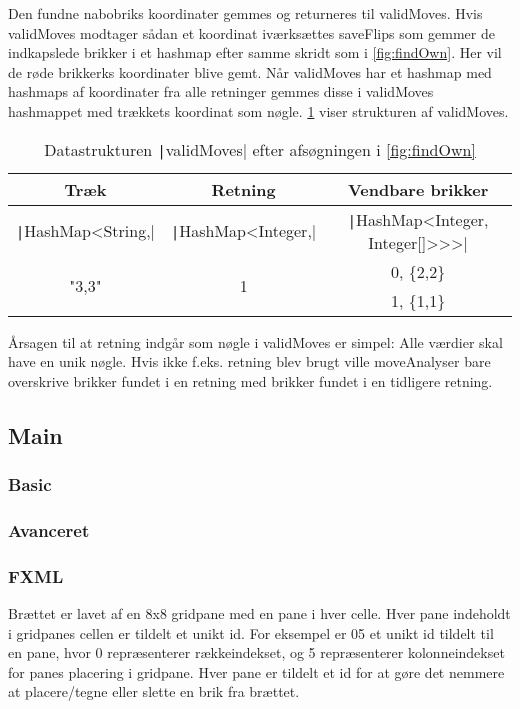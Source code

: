 Den fundne nabobriks koordinater gemmes og returneres til validMoves. Hvis validMoves modtager sådan et koordinat iværksættes saveFlips som gemmer de indkapslede brikker i et hashmap efter samme skridt som i \cref{fig:findOwn}. Her vil de røde brikkerks koordinater blive gemt.\newline
Når validMoves har et hashmap med hashmaps af koordinater fra alle retninger gemmes disse i validMoves hashmappet med trækkets koordinat som nøgle. \cref{tbl:hashmaps} viser strukturen af validMoves.
\begin{table}[H]
    \centering
    \caption{Datastrukturen \texttt|validMoves| efter afsøgningen i \cref{fig:findOwn}}\label{tbl:hashmaps}
    \begin{tabular}{ccc}
        \toprule
        Træk                               & Retning                             & Vendbare brikker                                 \\
        \midrule
        \texttt|HashMap<String,| & \texttt|HashMap<Integer,| & \texttt|HashMap<Integer, Integer[]>>>| \\
        \multirow{2}{*}{"3,3"}             & \multirow{2}{*}{1}                  & 0, \{2,2\}                                         \\
                                           &                                     & 1, \{1,1\}                                         \\
        \bottomrule
    \end{tabular}
\end{table}
Årsagen til at retning indgår som nøgle i validMoves er simpel: Alle værdier skal have en unik nøgle. Hvis ikke f.eks. retning blev brugt ville moveAnalyser bare overskrive brikker fundet i en retning med brikker fundet i en tidligere retning.
\subsection{Main}

\subsubsection{Basic}

\subsubsection{Avanceret}

\subsubsection{FXML}\label{BD}
Brættet er lavet af en 8x8 gridpane med en pane i hver celle. Hver pane indeholdt i gridpanes cellen er tildelt et unikt id. For eksempel er 05 et unikt id tildelt til en pane, hvor 0 repræsenterer rækkeindekset, og 5 repræsenterer kolonneindekset for panes placering i gridpane. Hver pane er tildelt et id for at gøre det nemmere at placere/tegne eller slette en brik fra brættet.



